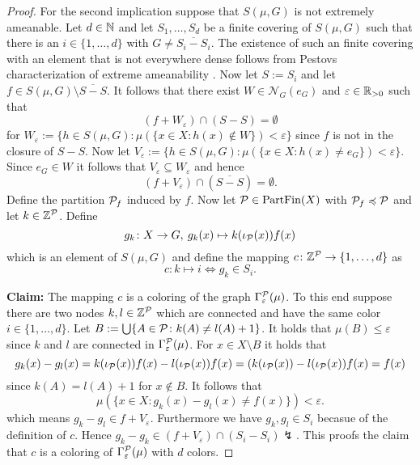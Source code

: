 \begin{proof}
  For the second implication suppose that $S(\mu, G)$ is not extremely ameanable. Let $d \in \N$ and let $S_1, \ldots, S_d$ be a finite covering of $S(\mu, G)$ such that there is an $i \in \{1, \ldots, d\}$ with $G \neq \overline{S_i - S_i}$. The existence of such an finite covering with an element that is not everywhere dense follows from Pestovs characterization of extreme ameanability \cite[Theorem 3.4.9]{PestovDyn}.
  Now let $S := S_i$ and let $f \in S(\mu, G) \setminus \overline{S - S}$. It follows that there exist $W \in \mathcal{N}_G(e_G)$ and $\varepsilon \in \R_{>0}$ such that
  \begin{equation*}
    (f + W_\varepsilon) \cap (S - S) = \emptyset
  \end{equation*}
  for $W_\varepsilon := \{h \in S(\mu, G)\colon \mu(\{x\in X\colon h(x) \notin W\}) < \varepsilon\}$ since $f$ is not in the closure of $S - S$. 
  Now let $V_\varepsilon := \{h \in S(\mu, G)\colon \mu(\{x\in X\colon h(x) \neq e_G\}) < \varepsilon\}$. Since $e_G \in W$ it follows that $V_\varepsilon \subseteq W_\varepsilon$ and hence
  \begin{equation*}
    (f + V_\varepsilon) \cap (\overline{S - S}) = \emptyset.
  \end{equation*}
  Define the partition $\P_f$ induced by $f$.
  Now let $\P \in {\rm PartFin}(X)$ with $\P_f \preccurlyeq \P$ and let $k \in \Z^\P$.
  Define
  \begin{equation*}
    g_k\colon X \to G, \: g_k(x) \mapsto k(\iota_\P(x))f(x)
  \end{equation*}
  which is an element of $S(\mu, G)$ and define the mapping $c\colon \Z^\P \to \{1,\ldots, d\}$ as
  \begin{equation*}
    c\colon k \mapsto i \iff g_k \in S_i.
  \end{equation*}

  \textbf{Claim:} The mapping $c$ is a coloring of the graph $\Gamma_\varepsilon^\P(\mu)$. To this end suppose there are two nodes $k, l \in \Z^\P$ which are connected and have the same color $i \in \{1, \ldots, d\}$. Let $B := \bigcup\{A\in\P\colon k(A) \neq l(A) + 1\}$. It holds that $\mu(B) \leq \varepsilon$ since $k$ and $l$ are connected in $\Gamma_\varepsilon^\P(\mu)$. For $x \in X\setminus B$ it holds that
  \begin{equation*}
    g_k(x) - g_l(x) = k(\iota_\P(x))f(x) - l(\iota_\P(x))f(x) = (k(\iota_\P(x)) - l(\iota_\P(x)) f(x) = f(x)
  \end{equation*}
  since $k(A) = l(A) + 1$ for $x \notin B$. It follows that
  \begin{equation*}
    \mu(\{x\in X\colon g_k(x) - g_l(x) \neq f(x)\}) < \varepsilon.
  \end{equation*}
  which means $g_k - g_l \in f + V_\varepsilon$. Furthermore we have $g_k, g_l \in S_i$ becasue of the definition of $c$. Hence $g_k - g_k \in (f + V_\varepsilon) \cap (S_i - S_i) \lightning$.
  This proofs the claim that $c$ is a coloring of $\Gamma_\varepsilon^\P(\mu)$ with $d$ colors.
\end{proof}
